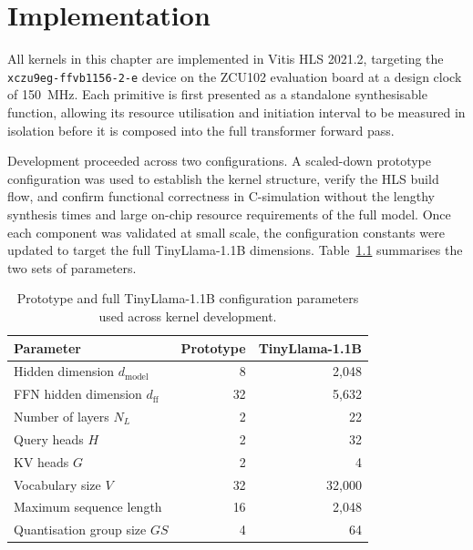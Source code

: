 %

\chapter{Implementation}
\label{ch:implementation}

All kernels in this chapter are implemented in Vitis HLS 2021.2,
targeting the \texttt{xczu9eg-ffvb1156-2-e} device on the ZCU102 evaluation
board at a design clock of \SI{150}{\mega\hertz}. Each primitive is first
presented as a standalone synthesisable function, allowing its resource
utilisation and initiation interval to be measured in isolation before it
is composed into the full transformer forward pass.

Development proceeded across two configurations. A scaled-down prototype
configuration was used to establish the kernel structure, verify the HLS
build flow, and confirm functional correctness in C-simulation without the
lengthy synthesis times and large on-chip resource requirements of the full
model. Once each component was validated at small scale, the configuration
constants were updated to target the full TinyLlama-1.1B dimensions.
Table~\ref{tab:config_comparison} summarises the two sets of parameters.

\begin{table}[H]
  \centering
  \begin{tabular}{lrr}
    \toprule
    Parameter & Prototype & TinyLlama-1.1B \\
    \midrule
    Hidden dimension $d_{\text{model}}$ & 8       & 2{,}048  \\
    FFN hidden dimension $d_{\text{ff}}$ & 32     & 5{,}632  \\
    Number of layers $N_L$               & 2       & 22       \\
    Query heads $H$                      & 2       & 32       \\
    KV heads $G$                         & 2       & 4        \\
    Vocabulary size $V$                  & 32      & 32{,}000 \\
    Maximum sequence length              & 16      & 2{,}048  \\
    Quantisation group size $GS$         & 4       & 64       \\
    \bottomrule
  \end{tabular}
  \caption{Prototype and full TinyLlama-1.1B configuration parameters
           used across kernel development.}
  \label{tab:config_comparison}

\end{table}

